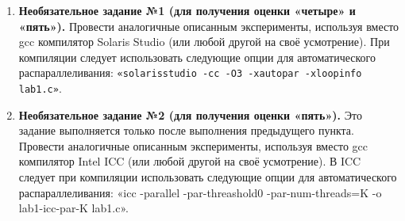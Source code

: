 {\begin{enumerate}
			\begin{itemize}
				 lab1-seq для значений \\$N\;=\;{N1,\;N1+\Delta,\;N1+2\Delta,\;N1+3\Delta,…,\;N2}$ и записывать получающиеся значения времени delta\textunderscore ms(N) в функцию $seq(N)$;
				 lab1-par-K для значений \\$N\;=\;{N1,\;N1+\Delta,\;N1+2\Delta,\;N1+3\Delta,…,\;N2}$ и записывать получающиеся значения времени delta\textunderscore ms(N) в функцию $par-K(N)$;
				 $\Delta$ выбрать так: $\Delta\;=\;(N2\;-\;N1)/10$.
			\end{itemize}
		 верификацию значения X. Добавить в конец цикла вывод значения X и изменить количество экспериментов на 5. Сравнить значения X для распараллеленной программы и не распараллеленной.
		 отчёт о проделанной работе.
		 к устным вопросам на защите.
		 вычислительную сложность алгоритма до и после распараллеливания, сравнить полученные результаты.
		\sloppy
		\item\textbf{Необязательное задание №1 (для получения оценки «четыре» и «пять»).} Провести аналогичные описанным эксперименты, используя вместо gcc компилятор Solaris Studio (или любой другой на своё усмотрение). При компиляции следует использовать следующие опции для автоматического распараллеливания: \verb+«solarisstudio -cc -O3 -xautopar -xloopinfo lab1.c»+.
 		\item\textbf{Необязательное задание №2 (для получения оценки «пять»).} Это задание выполняется только после выполнения предыдущего пункта. Провести аналогичные описанным эксперименты, используя вместо gcc компилятор Intel ICC (или любой другой на своё усмотрение). В ICC следует при компиляции использовать следующие опции для автоматического распараллеливания: «icc -parallel -par-threashold0 -par-num-threads=K -o lab1-icc-par-K lab1.c».
	\end{enumerate}
	
}